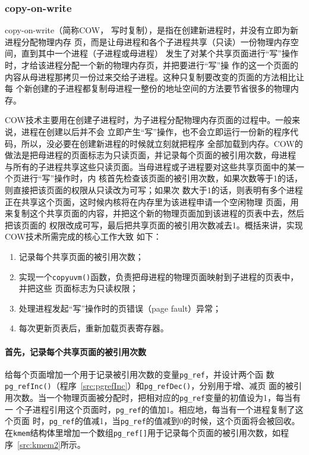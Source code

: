 \documentclass{swfuthesism}
\begin{document}
\subsubsection{copy-on-write}

copy-on-write（简称COW， 写时复制），是指在创建新进程时，并没有立即为新进程分配物理内存
页，而是让母进程和各个子进程共享（只读）一份物理内存空间，直到其中一个进程（子进程或母进程）
发生了对某个共享页面进行``写''操作时，才给该进程分配一个新的物理内存页，并把要进行``写''操
作的这一个页面的内容从母进程那拷贝一份过来交给子进程。这种只复制要改变的页面的方法相比让每
个新创建的子进程都复制母进程一整份的地址空间的方法要节省很多的物理内存。

COW技术主要用在创建子进程时，为子进程分配物理内存页面的过程中。一般来说，进程在创建以后并不会
立即产生``写''操作，也不会立即运行一份新的程序代码，所以，没必要在创建新进程的时候就立刻就把程序
全部加载到内存。COW的做法是把母进程的页面标志为只读页面，并记录每个页面的被引用次数，母进程
与所有的子进程共享这些只读页面。当母进程或子进程要对这些共享页面中的某一个页进行``写''操作时，内
核首先检查该页面的被引用次数，如果次数等于1的话，则直接把该页面的权限从只读改为可写；如果次
数大于1的话，则表明有多个进程正在共享这个页面，这时候内核将在内存里为该进程申请一个空闲物理
页面，用来复制这个共享页面的内容，并把这个新的物理页面加到该进程的页表中去，然后把该页面的
权限改成可写，最后把共享页面的被引用次数减去1。概括来讲，实现COW技术所需完成的核心工作大致
如下：
\begin{enumerate}
\item 记录每个共享页面的被引用次数；
\item 实现一个\texttt{copyuvm()}函数，负责把母进程的物理页面映射到子进程的页表中，并把这些
  页面标志为只读权限；
\item 处理进程发起``写''操作时的页错误（page fault）异常；
\item 每次更新页表后，重新加载页表寄存器。
\end{enumerate}

\paragraph{首先，记录每个共享页面的被引用次数}

给每个页面增加一个用于记录被引用次数的变量\texttt{pg\_ref}，并设计两个函
数\texttt{pg\_refInc()}（程序~\ref{src:pgrefInc}）和\texttt{pg\_refDec()}，分别用于增、减页
面的被引用次数。当一个物理页面被分配时，把相对应的\texttt{pg\_ref}变量的初值设为1，每当有一
个子进程引用这个页面时，\texttt{pg\_ref}的值加1。相应地，每当有一个进程复制了这个页面
时，\texttt{pg\_ref}的值减1，当\texttt{pg\_ref}的值减到0的时候，这个页面将会被回收。
在\texttt{kmem}结构体里增加一个数组\texttt{pg\_ref[]}用于记录每个页面的被引用次数，如程
序~\ref{src:kmem2}所示。
\end{document}
